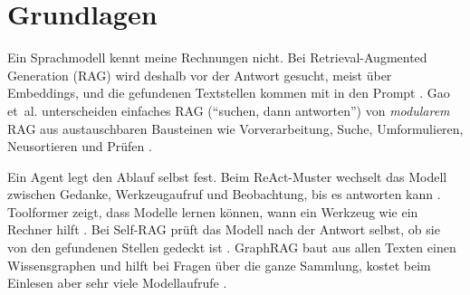 
\chapter{Grundlagen}
\label{chap:grundlagen}

Ein Sprachmodell kennt meine Rechnungen nicht. Bei Retrieval-Augmented Generation (RAG) wird deshalb vor der Antwort gesucht, meist über Embeddings, und die gefundenen Textstellen kommen mit in den Prompt \cite{lewis2020}. Gao et~al. unterscheiden einfaches RAG (\enquote{suchen, dann antworten}) von \emph{modularem} RAG aus austauschbaren Bausteinen wie Vorverarbeitung, Suche, Umformulieren, Neusortieren und Prüfen \cite{gao2023}.

Ein Agent legt den Ablauf selbst fest. Beim ReAct-Muster wechselt das Modell zwischen Gedanke, Werkzeugaufruf und Beobachtung, bis es antworten kann \cite{yao2023}. Toolformer zeigt, dass Modelle lernen können, wann ein Werkzeug wie ein Rechner hilft \cite{schick2023}. Bei Self-RAG prüft das Modell nach der Antwort selbst, ob sie von den gefundenen Stellen gedeckt ist \cite{asai2024}. GraphRAG baut aus allen Texten einen Wissensgraphen und hilft bei Fragen über die ganze Sammlung, kostet beim Einlesen aber sehr viele Modellaufrufe \cite{edge2024}.
